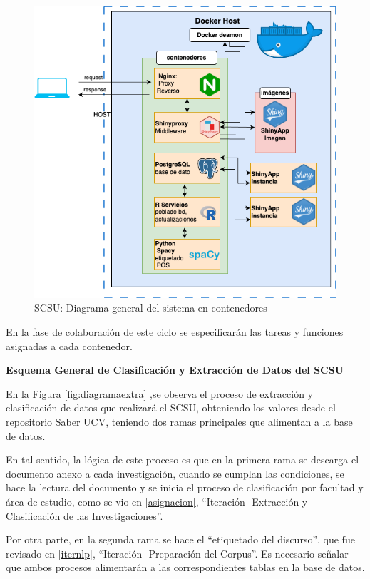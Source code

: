 \documentclass[
  12pt,
  openany]{book}
\begin{document}
\begin{figure}

{\centering \includegraphics[width=0.8\linewidth]{images/05-desarrollo/4_ciclo/digrama_contenedores_modulos} 

}

\caption{SCSU: Diagrama general del sistema en contenedores}\label{fig:diagramacontenedores}
\end{figure}

En la fase de colaboración de este ciclo se especificarán las tareas y funciones asignadas a cada contenedor.

\textbf{Esquema General de Clasificación y Extracción de Datos del SCSU}

En la Figura \ref{fig:diagramaextra} ,se observa el proceso de extracción y clasificación de datos que realizará el SCSU, obteniendo los valores desde el repositorio Saber UCV, teniendo dos ramas principales que alimentan a la base de datos.

En tal sentido, la lógica de este proceso es que en la primera rama se descarga el documento anexo a cada investigación, cuando se cumplan las condiciones, se hace la lectura del documento y se inicia el proceso de clasificación por facultad y área de estudio, como se vio en \ref{asignacion}, ``Iteración- Extracción y Clasificación de las Investigaciones''.

Por otra parte, en la segunda rama se hace el ``etiquetado del discurso'', que fue revisado en \ref{iternlp}, ``Iteración- Preparación del Corpus''. Es necesario señalar que ambos procesos alimentarán a las correspondientes tablas en la base de datos.
\end{document}
